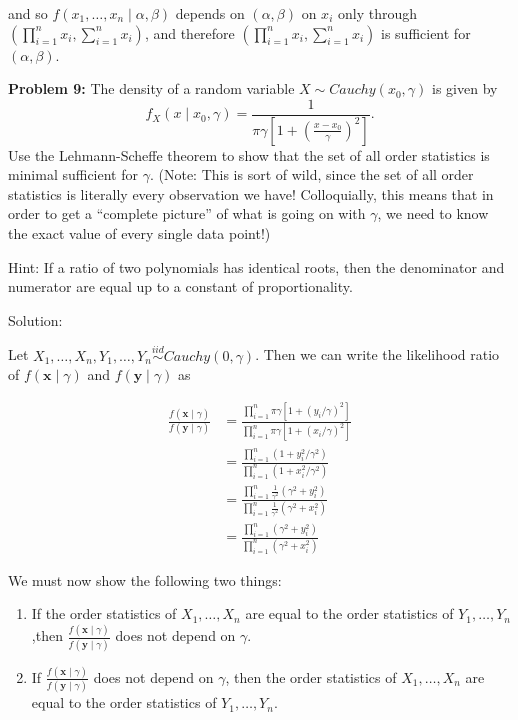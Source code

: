 \documentclass[
  letterpaper,
  DIV=11,
  numbers=noendperiod]{scrreprt}
\begin{document}
and so \(f(x_1, \dots, x_n \mid \alpha, \beta)\) depends on
\((\alpha, \beta)\) on \(x_i\) only through
\((\prod_{i = 1}^n x_i, \sum_{i = 1}^n x_i)\), and therefore
\((\prod_{i = 1}^n x_i, \sum_{i = 1}^n x_i)\) is sufficient for
\((\alpha, \beta)\).

\textbf{Problem 9:} The density of a random variable
\(X \sim Cauchy(x_0, \gamma)\) is given by \[
f_X(x \mid x_0, \gamma) = \frac{1}{\pi \gamma \left[ 1 + \left( \frac{x - x_0}{\gamma}\right)^2 \right]}.
\] Use the Lehmann-Scheffe theorem to show that the set of all order
statistics is minimal sufficient for \(\gamma\). (Note: This is sort of
wild, since the set of all order statistics is literally every
observation we have! Colloquially, this means that in order to get a
``complete picture'' of what is going on with \(\gamma\), we need to
know the exact value of every single data point!)

Hint: If a ratio of two polynomials has identical roots, then the
denominator and numerator are equal up to a constant of proportionality.

Solution:

Let
\(X_1, \dots, X_n, Y_1, \dots, Y_n \overset{iid}{\sim} Cauchy(0, \gamma)\).
Then we can write the likelihood ratio of \(f(\textbf{x} \mid \gamma)\)
and \(f(\textbf{y} \mid \gamma)\) as

\begin{align*}
    \frac{f(\textbf{x} \mid \gamma)}{f(\textbf{y} \mid \gamma)} & = \frac{\prod_{i = 1}^n \pi \gamma [1 + (y_i/\gamma)^2]}{\prod_{i = 1}^n \pi \gamma [1 + (x_i/\gamma)^2]} \\
    & = \frac{\prod_{i = 1}^n  (1 + y_i^2/\gamma^2)}{\prod_{i = 1}^n  (1 + x_i^2/ \gamma^2)} \\
    & = \frac{\prod_{i = 1}^n  \frac{1}{\gamma^2}(\gamma^2 + y_i^2)}{\prod_{i = 1}^n \frac{1}{\gamma^2} (\gamma^2 + x_i^2)} \\
    & = \frac{\prod_{i = 1}^n  (\gamma^2 + y_i^2)}{\prod_{i = 1}^n  (\gamma^2 + x_i^2)}
\end{align*}

We must now show the following two things:

\begin{enumerate}
    \item If the order statistics of $X_1, \dots, X_n$ are equal to the order statistics of $Y_1, \dots, Y_n$,then $\frac{f(\textbf{x} \mid \gamma)}{f(\textbf{y} \mid \gamma)}$ does not depend on $\gamma$.
    \item If $\frac{f(\textbf{x} \mid \gamma)}{f(\textbf{y} \mid \gamma)}$ does not depend on $\gamma$, then the order statistics of $X_1, \dots, X_n$ are equal to the order statistics of $Y_1, \dots, Y_n$.
\end{enumerate}
\end{document}
